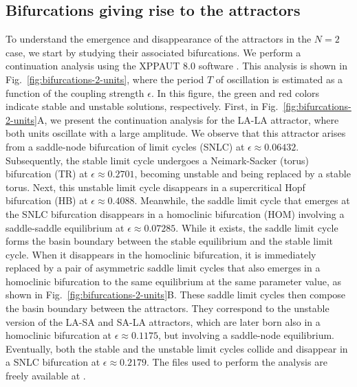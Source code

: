 \subsection{Bifurcations giving rise to the attractors}\label{sec:bifurcations}
To understand the emergence and disappearance of the attractors in the $N=2$ case, we start by studying their associated bifurcations. We perform a continuation analysis using the XPPAUT 8.0 software \cite{ermentrout2002simulating}. This analysis is shown in Fig.~\ref{fig:bifurcations-2-units}, where the period $T$ of oscillation is estimated as a function of the coupling strength $\epsilon$. In this figure, the  green and red colors indicate stable and unstable solutions, respectively. First, in Fig.~\ref{fig:bifurcations-2-units}A, we present the continuation analysis for the LA-LA attractor, where both units oscillate with a large amplitude. We observe that this attractor arises from a saddle-node bifurcation of limit cycles (SNLC) at $\epsilon \approx 0.06432$. Subsequently, the stable limit cycle undergoes a Neimark-Sacker (torus) bifurcation (TR) at $\epsilon \approx 0.2701$, becoming unstable and being replaced by a stable torus. Next, this unstable limit cycle disappears in a supercritical Hopf bifurcation (HB) at $\epsilon \approx 0.4088$. Meanwhile, the saddle limit cycle that emerges at the SNLC bifurcation disappears in a homoclinic bifurcation (HOM) involving a saddle-saddle equilibrium at $\epsilon \approx 0.07285$. While it exists, the saddle limit cycle forms the basin boundary between the stable equilibrium and the stable limit cycle. When it disappears in the homoclinic bifurcation, it is immediately replaced by a pair of asymmetric saddle limit cycles that also emerges in a homoclinic bifurcation to the same equilibrium at the same parameter value, as shown in Fig.~\ref{fig:bifurcations-2-units}B. These saddle limit cycles then compose the basin boundary between the attractors. They correspond to the unstable version of the LA-SA and SA-LA attractors, which are later born also in a homoclinic bifurcation at $\epsilon \approx 0.1175$, but involving a saddle-node equilibrium. Eventually, both the stable and the unstable limit cycles collide and disappear in a SNLC bifurcation at $\epsilon \approx 0.2179$. The files used to perform the analysis are freely available at \cite{rossi2024multistabilitygithub}.
%
